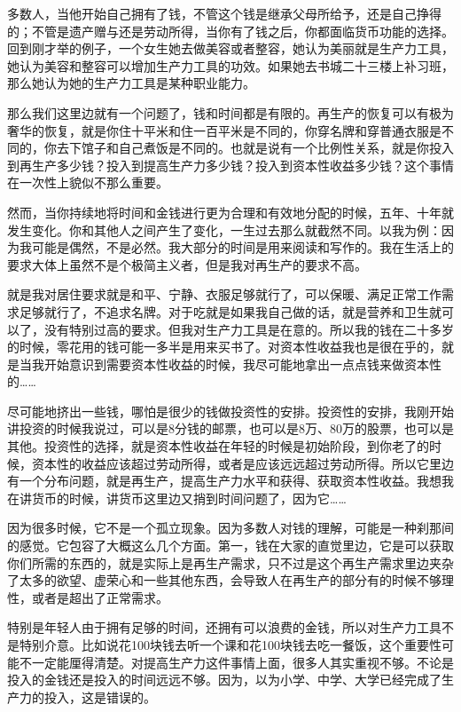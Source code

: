 \documentclass[UTF8, 12pt, a4paper]{ctexrep}
\begin{document}
多数人，当他开始自己拥有了钱，不管这个钱是继承父母所给予，还是自己挣得的；不管是遗产赠与还是劳动所得，当你有了钱之后，你都面临货币功能的选择。回到刚才举的例子，一个女生她去做美容或者整容，她认为美丽就是生产力工具，她认为美容和整容可以增加生产力工具的功效。如果她去书城二十三楼上补习班，那么她认为她的生产力工具是某种职业能力。

那么我们这里边就有一个问题了，钱和时间都是有限的。再生产的恢复可以有极为奢华的恢复，就是你住十平米和住一百平米是不同的，你穿名牌和穿普通衣服是不同的，你去下馆子和自己煮饭是不同的。也就是说有一个比例性关系，就是你投入到再生产多少钱？投入到提高生产力多少钱？投入到资本性收益多少钱？这个事情在一次性上貌似不那么重要。

然而，当你持续地将时间和金钱进行更为合理和有效地分配的时候，五年、十年就发生变化。你和其他人之间产生了变化，一生过去那么就截然不同。以我为例：因为我可能是偶然，不是必然。我大部分的时间是用来阅读和写作的。我在生活上的要求大体上虽然不是个极简主义者，但是我对再生产的要求不高。

就是我对居住要求就是和平、宁静、衣服足够就行了，可以保暖、满足正常工作需求足够就行了，不追求名牌。对于吃就是如果我自己做的话，就是营养和卫生就可以了，没有特别过高的要求。但我对生产力工具是在意的。所以我的钱在二十多岁的时候，零花用的钱可能一多半是用来买书了。对资本性收益我也是很在乎的，就是当我开始意识到需要资本性收益的时候，我尽可能地拿出一点点钱来做资本性的……

尽可能地挤出一些钱，哪怕是很少的钱做投资性的安排。投资性的安排，我刚开始讲投资的时候我说过，可以是8分钱的邮票，也可以是8万、80万的股票，也可以是其他。投资性的选择，就是资本性收益在年轻的时候是初始阶段，到你老了的时候，资本性的收益应该超过劳动所得，或者是应该远远超过劳动所得。所以它里边有一个分布问题，就是再生产，提高生产力水平和获得、获取资本性收益。我想我在讲货币的时候，讲货币这里边又捎到时间问题了，因为它……

因为很多时候，它不是一个孤立现象。因为多数人对钱的理解，可能是一种刹那间的感觉。它包容了大概这么几个方面。第一，钱在大家的直觉里边，它是可以获取你们所需的东西的，就是实际上是再生产需求，只不过是这个再生产需求里边夹杂了太多的欲望、虚荣心和一些其他东西，会导致人在再生产的部分有的时候不够理性，或者是超出了正常需求。

特别是年轻人由于拥有足够的时间，还拥有可以浪费的金钱，所以对生产力工具不是特别介意。比如说花100块钱去听一个课和花100块钱去吃一餐饭，这个重要性可能不一定能厘得清楚。对提高生产力这件事情上面，很多人其实重视不够。不论是投入的金钱还是投入的时间远远不够。因为，以为小学、中学、大学已经完成了生产力的投入，这是错误的。
\end{document}
